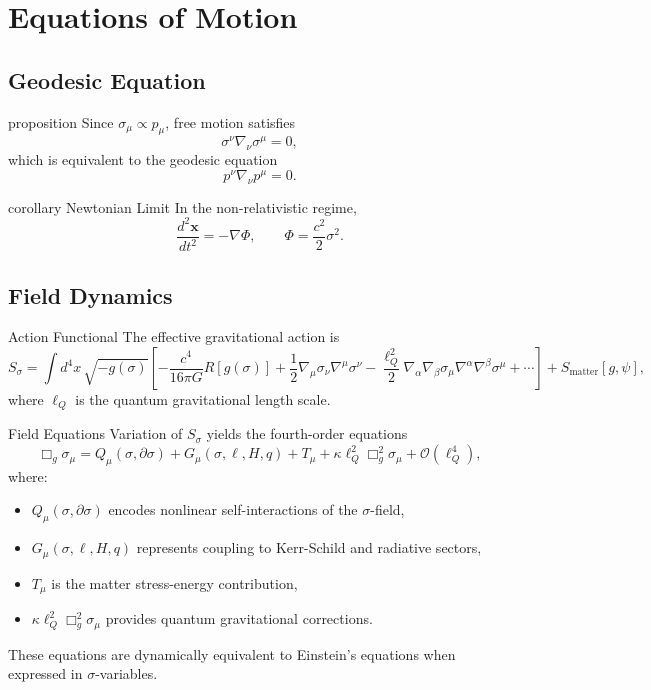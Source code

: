 \documentclass[11pt,a4paper]{article}
\theoremstyle{definition}
\theoremstyle{remark}
\begin{document}
	\section{Equations of Motion}
	
	\subsection{Geodesic Equation}
	
	proposition
		Since $\sigma_\mu \propto p_\mu$, free motion satisfies
		\begin{equation}
			\sigma^\nu \nabla_\nu \sigma^\mu = 0,
		\end{equation}
		which is equivalent to the geodesic equation
		\begin{equation}
			p^\nu \nabla_\nu p^\mu = 0.
		\end{equation}
	
	corollary Newtonian Limit
		In the non-relativistic regime,
		\begin{equation}
			\frac{d^2\mathbf{x}}{dt^2} = -\nabla \Phi, \qquad \Phi = \frac{c^2}{2}\sigma^2.
		\end{equation}
	
	\subsection{Field Dynamics}
	
	Action Functional
		The effective gravitational action is
		\begin{equation}
			S_\sigma = \int d^4x \, \sqrt{-g(\sigma)} \left[
			-\frac{c^4}{16\pi G} R[g(\sigma)] + \frac{1}{2}\nabla_\mu \sigma_\nu \nabla^\mu \sigma^\nu - \frac{\ell_Q^2}{2} \nabla_\alpha\nabla_\beta\sigma_\mu \nabla^\alpha\nabla^\beta\sigma^\mu + \cdots
			\right] + S_{\text{matter}}[g,\psi],
		\end{equation}
		where $\ell_Q$ is the quantum gravitational length scale.
	
	Field Equations
		Variation of $S_\sigma$ yields the fourth-order equations
		\begin{equation}
			\boxed{\Box_g \sigma_\mu = Q_\mu(\sigma, \partial\sigma) + G_\mu(\sigma, \ell, H, q) + T_\mu + \kappa\ell_Q^2 \Box_g^2 \sigma_\mu + \mathcal{O}(\ell_Q^4),}
		\end{equation}
		where:
		\begin{itemize}
			\item $Q_\mu(\sigma, \partial\sigma)$ encodes nonlinear self-interactions of the $\sigma$-field,
			\item $G_\mu(\sigma, \ell, H, q)$ represents coupling to Kerr-Schild and radiative sectors,
			\item $T_\mu$ is the matter stress-energy contribution,
			\item $\kappa\ell_Q^2 \Box_g^2 \sigma_\mu$ provides quantum gravitational corrections.
		\end{itemize}
		These equations are dynamically equivalent to Einstein's equations when expressed in $\sigma$-variables.
	
\end{document}
